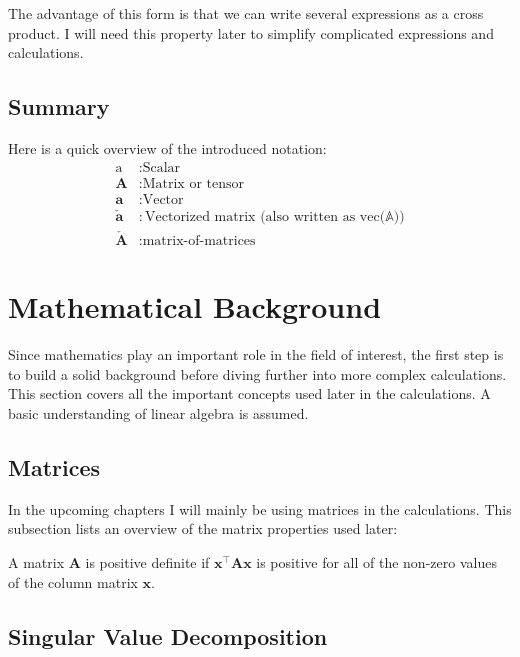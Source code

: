 The advantage of this form is that we can write several expressions as a cross product. I will need this property later to simplify complicated expressions and calculations.


\subsection{Summary}
Here is a quick overview of the introduced notation:
\begin{align*}
\text{a}&: \text{Scalar} \\
\mathbf{A}&: \text{Matrix or tensor} \\
\mathbf{a}&: \text{Vector} \\
\mathbf{\check{a}}&: \text{Vectorized matrix (also written as vec($\mathbb{A}$))} \\
\mathbf{\check{A}}&: \text{matrix-of-matrices}
\end{align*}



\section{Mathematical Background}
Since mathematics play an important role in the field of interest, the first step is to build a solid background before diving further into more complex calculations. This section covers all the important concepts used later in the calculations. A basic understanding of linear algebra is assumed.


\subsection{Matrices}
In the upcoming chapters I will mainly be using matrices  in the calculations. This subsection lists an overview of the matrix properties used later:

\begin{property}
A matrix $\mathbf{A}$ is positive definite if $\mathbf{x}^\intercal \mathbf{Ax}$ is positive for all of the non-zero values of the column matrix $\mathbf{x}$.
\end{property}



\subsection{Singular Value Decomposition}

